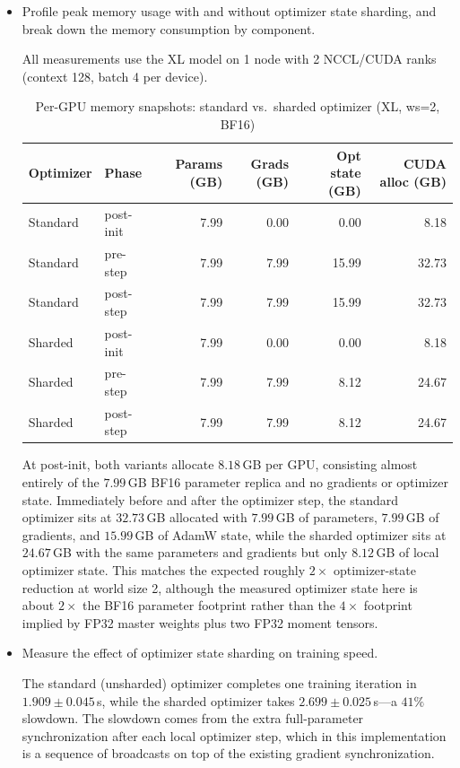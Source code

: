 \documentclass[letterpaper]{article}
\begin{document}
	\begin{itemize}
		\item[(a)] Profile peak memory usage with and without optimizer state sharding, and break down the memory consumption by component.
		
		All measurements use the XL model on 1 node with 2 NCCL/CUDA ranks (context 128, batch 4 per device).
		\begin{table}[H]
			\centering
			\caption{Per-GPU memory snapshots: standard vs.\ sharded optimizer (XL, ws=2, BF16)}
			\label{tab:sharded-mem}
			\begin{tabular}{llrrrr}
				\hline
				Optimizer & Phase & Params (GB) & Grads (GB) & Opt state (GB) & CUDA alloc (GB) \\
				\hline
				Standard & post-init   & 7.99 & 0.00 &  0.00 &  8.18 \\
				Standard & pre-step    & 7.99 & 7.99 & 15.99 & 32.73 \\
				Standard & post-step   & 7.99 & 7.99 & 15.99 & 32.73 \\
				Sharded  & post-init   & 7.99 & 0.00 &  0.00 &  8.18 \\
				Sharded  & pre-step    & 7.99 & 7.99 &  8.12 & 24.67 \\
				Sharded  & post-step   & 7.99 & 7.99 &  8.12 & 24.67 \\
				\hline
			\end{tabular}
		\end{table}
		
		At post-init, both variants allocate $8.18$\,GB per GPU, consisting almost entirely of the $7.99$\,GB BF16 parameter replica and no gradients or optimizer state.
		Immediately before and after the optimizer step, the standard optimizer sits at $32.73$\,GB allocated with $7.99$\,GB of parameters, $7.99$\,GB of gradients, and $15.99$\,GB of AdamW state, while the sharded optimizer sits at $24.67$\,GB with the same parameters and gradients but only $8.12$\,GB of local optimizer state.
		This matches the expected roughly $2\times$ optimizer-state reduction at world size 2, although the measured optimizer state here is about $2\times$ the BF16 parameter footprint rather than the $4\times$ footprint implied by FP32 master weights plus two FP32 moment tensors.
		
		\item[(b)] Measure the effect of optimizer state sharding on training speed.
		
		The standard (unsharded) optimizer completes one training iteration in $1.909 \pm 0.045$\,s, while the sharded optimizer takes $2.699 \pm 0.025$\,s---a $41\%$ slowdown.
		The slowdown comes from the extra full-parameter synchronization after each local optimizer step, which in this implementation is a sequence of broadcasts on top of the existing gradient synchronization.
		

\end{itemize}
\end{document}
